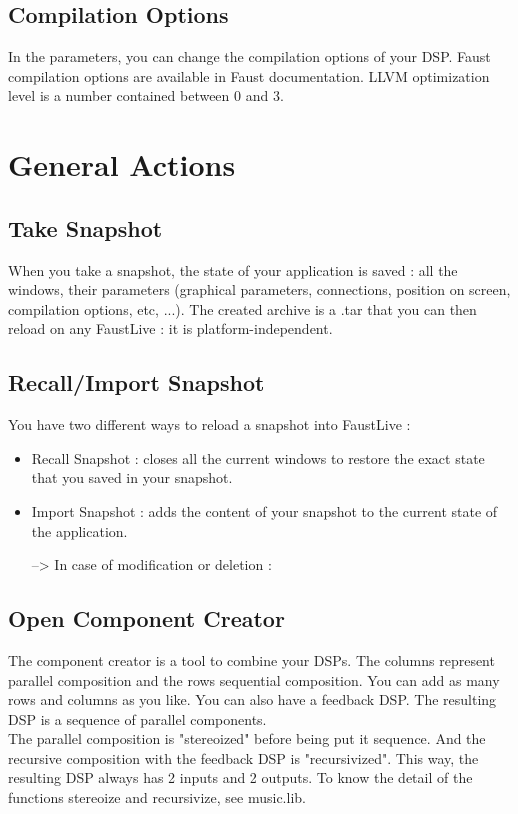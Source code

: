\documentclass[a4paper]{article}
\begin{document}
\subsection{Compilation Options}
In the parameters, you can change the compilation options of your DSP. Faust compilation options are available in Faust documentation. LLVM optimization level is a number contained between 0 and 3. 

\section{General Actions}

\subsection{Take Snapshot}
 When you take a snapshot, the state of your application is saved : all the windows, their parameters (graphical parameters, connections, position on screen, compilation options, etc, ...). The created archive is a .tar that you can then reload on any FaustLive : it is platform-independent. 

\subsection{Recall/Import Snapshot}
You have two different ways to reload a snapshot into FaustLive : 
\begin{itemize}
\item Recall Snapshot : closes all the current windows to restore the exact state that you saved in your snapshot.
\item Import Snapshot : adds the content of your snapshot to the current state of the application. 

--> In case of modification or deletion : 
\end{itemize}

\subsection{Open Component Creator}
The component creator is a tool to combine your DSPs. The columns represent parallel composition and the rows sequential composition. You can add as many rows and columns as you like. You can also have a feedback DSP. The resulting DSP is a sequence of parallel components. \\

The parallel composition is "stereoized" before being put it sequence. And the recursive composition with the feedback DSP is "recursivized". This way, the resulting DSP always has 2 inputs and 2 outputs. To know the detail of the functions stereoize and recursivize, see music.lib. 
\end{document}
